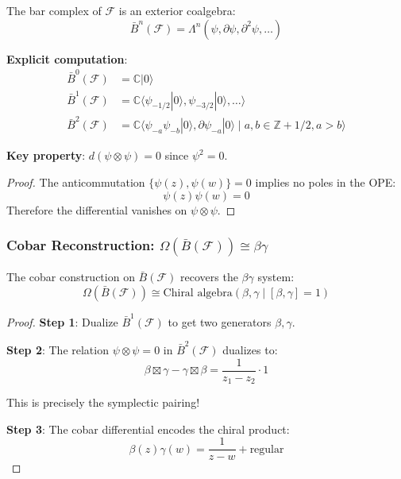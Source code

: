 \begin{proposition}
The bar complex of $\mathcal{F}$ is an exterior coalgebra:
$$\bar{B}^n(\mathcal{F}) = \Lambda^n(\psi, \partial\psi, \partial^2\psi, \ldots)$$

\textbf{Explicit computation}:
\begin{align}
\bar{B}^0(\mathcal{F}) &= \mathbb{C}|0\rangle \\
\bar{B}^1(\mathcal{F}) &= \mathbb{C}\langle \psi_{-1/2}|0\rangle, \psi_{-3/2}|0\rangle, \ldots \rangle \\
\bar{B}^2(\mathcal{F}) &= \mathbb{C}\langle \psi_{-a}\psi_{-b}|0\rangle, \partial\psi_{-a}|0\rangle \mid a,b \in \mathbb{Z}+1/2, a>b \rangle
\end{align}

\textbf{Key property}: $d(\psi \otimes \psi) = 0$ since $\psi^2 = 0$.
\end{proposition}

\begin{proof}
The anticommutation $\{\psi(z), \psi(w)\} = 0$ implies no poles in the OPE:
$$\psi(z)\psi(w) = 0$$
Therefore the differential vanishes on $\psi \otimes \psi$.
\end{proof}

\subsubsection{Cobar Reconstruction: $\Omega(\bar{B}(\mathcal{F})) \cong \beta\gamma$}

\begin{theorem}
The cobar construction on $\bar{B}(\mathcal{F})$ recovers the $\beta\gamma$ system:
$$\Omega(\bar{B}(\mathcal{F})) \cong \text{Chiral algebra}(\beta, \gamma \mid [\beta,\gamma] = 1)$$
\end{theorem}

\begin{proof}
\textbf{Step 1}: Dualize $\bar{B}^1(\mathcal{F})$ to get two generators $\beta, \gamma$.

\textbf{Step 2}: The relation $\psi \otimes \psi = 0$ in $\bar{B}^2(\mathcal{F})$ dualizes to:
$$\beta \boxtimes \gamma - \gamma \boxtimes \beta = \frac{1}{z_1-z_2} \cdot 1$$

This is precisely the symplectic pairing!

\textbf{Step 3}: The cobar differential encodes the chiral product:
$$\beta(z)\gamma(w) = \frac{1}{z-w} + \text{regular}$$
\end{proof}

